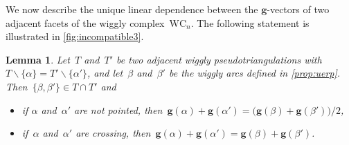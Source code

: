 \documentclass{amsart}
\newtheorem{lemma}[theorem]{Lemma}
\theoremstyle{definition}
\renewcommand{\b}[1]{{\boldsymbol{#1}}} %
\newcommand{\ssm}{\smallsetminus} %
\newcommand{\wigglyComplex}{\mathrm{WC}} %
\begin{document}
We now describe the unique linear dependence between the $\b{g}$-vectors of two adjacent facets of the wiggly complex~$\wigglyComplex_n$.
The following statement is illustrated in \cref{fig:incompatible3}.

\begin{lemma}
\label{lem:linearDependences}
Let~$T$ and~$T'$ be two adjacent wiggly pseudotriangulations with~$T \ssm \{\alpha\} = T' \ssm \{\alpha'\}$, and let~$\beta$ and~$\beta'$ be the wiggly arcs defined in \cref{prop:uerp}.
Then~$\{\beta, \beta'\} \in T \cap T'$ and
\begin{itemize}
\item if $\alpha$ and~$\alpha'$ are not pointed, then~$\b{g}(\alpha) + \b{g}(\alpha') = \big( \b{g}(\beta) + \b{g}(\beta') \big) / 2$,
\item if~$\alpha$ and~$\alpha'$ are crossing, then~${\b{g}(\alpha) + \b{g}(\alpha') = \b{g}(\beta) + \b{g}(\beta')}$.
\end{itemize}
\end{lemma}
\end{document}
